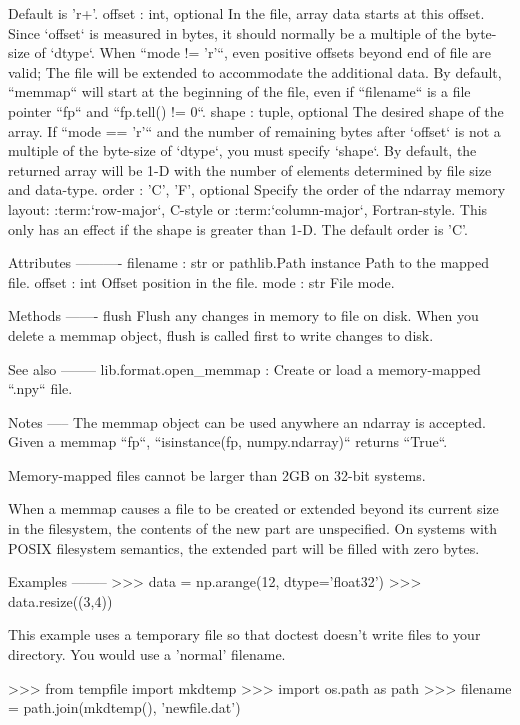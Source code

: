 \begin{DoxyVerb}
    Default is 'r+'.
offset : int, optional
    In the file, array data starts at this offset. Since `offset` is
    measured in bytes, it should normally be a multiple of the byte-size
    of `dtype`. When ``mode != 'r'``, even positive offsets beyond end of
    file are valid; The file will be extended to accommodate the
    additional data. By default, ``memmap`` will start at the beginning of
    the file, even if ``filename`` is a file pointer ``fp`` and
    ``fp.tell() != 0``.
shape : tuple, optional
    The desired shape of the array. If ``mode == 'r'`` and the number
    of remaining bytes after `offset` is not a multiple of the byte-size
    of `dtype`, you must specify `shape`. By default, the returned array
    will be 1-D with the number of elements determined by file size
    and data-type.
order : {'C', 'F'}, optional
    Specify the order of the ndarray memory layout:
    :term:`row-major`, C-style or :term:`column-major`,
    Fortran-style.  This only has an effect if the shape is
    greater than 1-D.  The default order is 'C'.

Attributes
----------
filename : str or pathlib.Path instance
    Path to the mapped file.
offset : int
    Offset position in the file.
mode : str
    File mode.

Methods
-------
flush
    Flush any changes in memory to file on disk.
    When you delete a memmap object, flush is called first to write
    changes to disk.


See also
--------
lib.format.open_memmap : Create or load a memory-mapped ``.npy`` file.

Notes
-----
The memmap object can be used anywhere an ndarray is accepted.
Given a memmap ``fp``, ``isinstance(fp, numpy.ndarray)`` returns
``True``.

Memory-mapped files cannot be larger than 2GB on 32-bit systems.

When a memmap causes a file to be created or extended beyond its
current size in the filesystem, the contents of the new part are
unspecified. On systems with POSIX filesystem semantics, the extended
part will be filled with zero bytes.

Examples
--------
>>> data = np.arange(12, dtype='float32')
>>> data.resize((3,4))

This example uses a temporary file so that doctest doesn't write
files to your directory. You would use a 'normal' filename.

>>> from tempfile import mkdtemp
>>> import os.path as path
>>> filename = path.join(mkdtemp(), 'newfile.dat')


\end{DoxyVerb}
